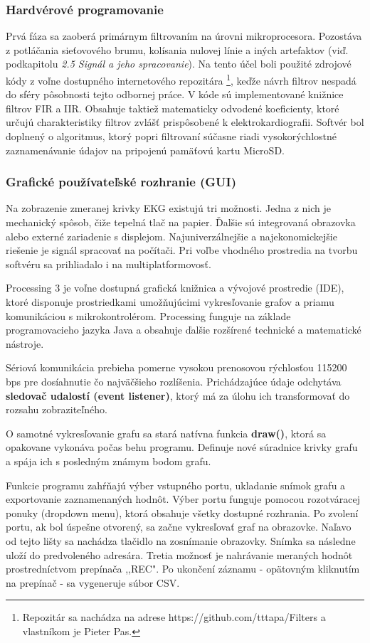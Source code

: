 \documentclass[titlepage,12pt]{article}
\begin{document}
\subsubsection{Hardvérové programovanie}
Prvá fáza sa zaoberá primárnym filtrovaním na úrovni mikroprocesora. Pozostáva z potláčania sieťovového brumu, kolísania nulovej línie a iných artefaktov (viď. podkapitolu \textit{2.5 Signál a jeho spracovanie}). Na tento účel boli použité zdrojové kódy z voľne dostupného internetového repozitára \footnote{Repozitár sa nachádza na adrese https://github.com/tttapa/Filters a vlastníkom je Pieter Pas.}, keďže návrh filtrov nespadá do sféry pôsobnosti tejto odbornej práce. V kóde sú implementované knižnice filtrov FIR a IIR. Obsahuje taktiež matematicky odvodené koeficienty, ktoré určujú charakteristiky filtrov zvlášť prispôsobené k elektrokardiografii. Softvér bol doplnený o algoritmus, ktorý popri filtrovaní súčasne riadi vysokorýchlostné zaznamenávanie údajov na pripojenú pamäťovú kartu MicroSD.

\subsubsection{Grafické používateľské rozhranie (GUI)}
Na zobrazenie zmeranej krivky EKG existujú tri možnosti. Jedna z nich je mechanický spôsob, čiže tepelná tlač na papier. Ďalšie sú integrovaná obrazovka alebo externé zariadenie s displejom. Najuniverzálnejšie a najekonomickejšie riešenie je signál spracovať na počítači. Pri voľbe vhodného prostredia na tvorbu softvéru sa prihliadalo i na multiplatformovosť.

Processing 3 je voľne dostupná grafická knižnica a vývojové prostredie (IDE), ktoré disponuje prostriedkami umožňujúcimi vykresľovanie grafov a priamu komunikáciou s mikrokontrolérom. Processing funguje na základe programovacieho jazyka Java a obsahuje ďalšie rozšírené technické a matematické nástroje. 

Sériová komunikácia prebieha pomerne vysokou prenosovou rýchlosťou 115200 bps pre dosíahnutie čo najväčšieho rozlíšenia. Prichádzajúce údaje odchytáva \textbf{sledovač udalostí (event listener)}, ktorý má za úlohu ich transformovať do rozsahu zobraziteľného.

O samotné vykresľovanie grafu sa stará natívna funkcia \textbf{draw()}, ktorá sa opakovane vykonáva počas behu programu. Definuje nové súradnice krivky grafu a spája ich s posledným známym bodom grafu.

Funkcie programu zahŕňajú výber vstupného portu, ukladanie snímok grafu a exportovanie zaznamenaných hodnôt. Výber portu funguje pomocou rozotváracej ponuky (dropdown menu), ktorá obsahuje všetky dostupné rozhrania. Po zvolení portu, ak bol úspešne otvorený, sa začne vykresľovať graf na obrazovke. Naľavo od tejto lišty sa nachádza tlačidlo na zosnímanie obrazovky. Snímka sa následne uloží do predvoleného adresára. Tretia možnosť je nahrávanie meraných hodnôt prostredníctvom prepínača ,,REC". Po ukončení záznamu - opätovným kliknutím na prepínač - sa vygeneruje súbor CSV.
\end{document}
